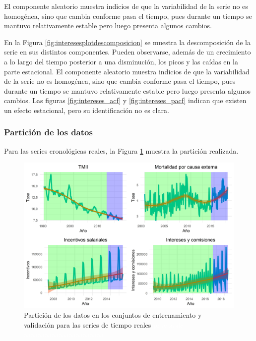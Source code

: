 \documentclass[
]{article}
\begin{document}
El componente aleatorio muestra indicios de que la variabilidad de la
serie no es homogénea, sino que cambia conforme pasa el tiempo, pues
durante un tiempo se mantuvo relativamente estable pero luego presenta
algunos cambios.

En la Figura \ref{fig:interesesplotdescomposicion} se muestra la
descomposición de la serie en sus distintos componentes. Pueden
observarse, además de un crecimiento a lo largo del tiempo posterior a
una disminución, los picos y las caídas en la parte estacional. El
componente aleatorio muestra indicios de que la variabilidad de la serie
no es homogénea, sino que cambia conforme pasa el tiempo, pues durante
un tiempo se mantuvo relativamente estable pero luego presenta algunos
cambios. Las figuras \ref{fig:intereses_acf} y \ref{fig:intereses_pacf}
indican que existen un efecto estacional, pero su identificación no es
clara.

\subsubsection{Partición de los datos}

Para las series cronológicas reales, la Figura
\ref{fig:particion_series_reales} muestra la partición realizada.

\begin{figure}[H]
\includegraphics[width=1\linewidth,height=1\textheight]{Tesis_files/figure-latex/particion_series_reales-1} \caption{Partición de los datos en los conjuntos de entrenamiento y validación para las series de tiempo reales \textcolor{white}{prueba de aaaaaaaaaaaaaaaaaaaaaaa}}\label{fig:particion_series_reales}
\end{figure}
\end{document}
